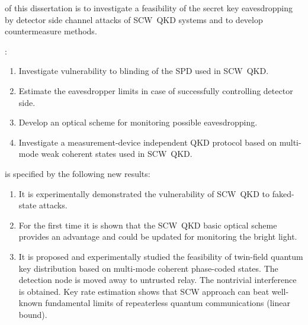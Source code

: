 
{\goal} of this dissertation is to investigate a feasibility of the secret key eavesdropping by detector side channel attacks of SCW~QKD systems and to develop countermeasure methods.


{\scientifictasks}:
\begin{enumerate}
  \item Investigate vulnerability to blinding of the SPD used in SCW~QKD.  

  \item Estimate the eavesdropper limits in case of successfully controlling detector side. 

  \item Develop an optical scheme for monitoring possible eavesdropping.

  \item Investigate a measurement-device independent QKD protocol based on multi-mode weak coherent states used in SCW~QKD. 
\end{enumerate}


{\scientificnovelty} is specified by the following new results:
\begin{enumerate}
  \item It is experimentally demonstrated the vulnerability of SCW~QKD to faked-state attacks.
  \item For the first time it is shown that the SCW~QKD basic optical scheme provides an advantage and could be updated for monitoring the bright light.
  \item It is proposed and experimentally studied the feasibility of twin-field quantum key distribution based on multi-mode coherent phase-coded states. The detection node is moved away to untrusted relay. The nontrivial interference is obtained. Key rate estimation shows that SCW approach can beat well-known fundamental limits of repeaterless quantum communications (linear bound).
\end{enumerate}

